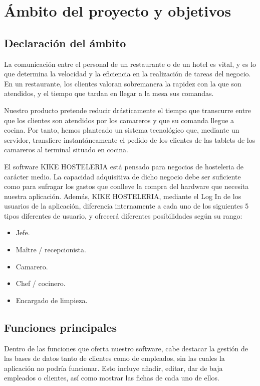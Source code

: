 \documentclass[spanish,a4paper,12pt]{report}	%
\begin{document}
	\section{Ámbito del proyecto y objetivos}

		\subsection{Declaración del ámbito}
La comunicación entre el personal de un restaurante o de un hotel es vital, y es lo que determina la velocidad y la eficiencia en la realización de tareas del negocio. En un restaurante, los clientes valoran sobremanera la rapidez con la que son atendidos, y el tiempo que tardan en llegar a la mesa sus comandas. 

Nuestro producto pretende reducir drásticamente el tiempo que transcurre entre que los clientes son atendidos por los camareros y que su comanda llegue a cocina. Por tanto, hemos planteado un sistema tecnológico que, mediante un servidor, transfiere instantáneamente el pedido de los clientes de las tablets de los camareros al terminal situado en cocina.

El software KIKE HOSTELERIA está pensado para negocios de hosteleria de carácter medio. La capacidad adquisitiva de dicho negocio debe ser suficiente como para sufragar los gastos que conlleve la compra del hardware que necesita nuestra aplicación.
Además, KIKE HOSTELERIA, mediante el Log In de los usuarios de la aplicación, diferencia internamente a cada uno de los siguientes 5 tipos diferentes de usuario, y  ofrecerá diferentes posibilidades según su rango:
	\begin{itemize}
		\item  Jefe.
		\item Maître / recepcionista.
		\item Camarero.
		\item Chef / cocinero.
		\item  Encargado de limpieza.
	\end {itemize}


		\subsection{Funciones principales} 

Dentro de las funciones  que oferta nuestro software, cabe destacar la gestión de las bases de datos tanto de clientes como de empleados, sin las cuales la aplicación no podría funcionar. Esto incluye añadir, editar, dar de baja empleados o clientes, así como mostrar las fichas de cada uno de ellos.
\end{document}
